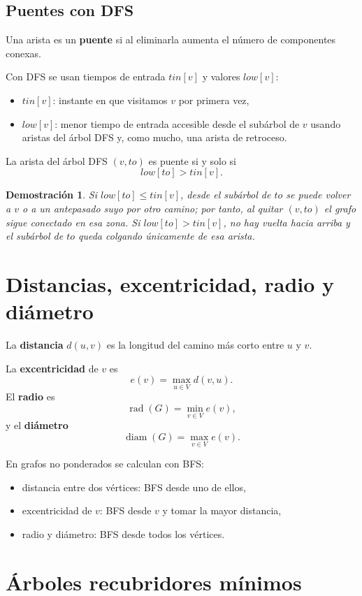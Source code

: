 \documentclass[11pt,a4paper]{article}
\newtheorem*{dem}{Demostración}
\begin{document}
\subsection{Puentes con DFS}
Una arista es un \textbf{puente} si al eliminarla aumenta el número de componentes conexas.

Con DFS se usan tiempos de entrada $tin[v]$ y valores $low[v]$:
\begin{itemize}
    \item $tin[v]$: instante en que visitamos $v$ por primera vez,
    \item $low[v]$: menor tiempo de entrada accesible desde el subárbol de $v$ usando aristas del árbol DFS y, como mucho, una arista de retroceso.
\end{itemize}

La arista del árbol DFS $(v,to)$ es puente si y solo si
\[
low[to]>tin[v].
\]

\begin{dem}
Si $low[to]\le tin[v]$, desde el subárbol de $to$ se puede volver a $v$ o a un antepasado suyo por otro camino; por tanto, al quitar $(v,to)$ el grafo sigue conectado en esa zona. Si $low[to]>tin[v]$, no hay vuelta hacia arriba y el subárbol de $to$ queda colgando únicamente de esa arista.
\end{dem}

\section{Distancias, excentricidad, radio y diámetro}

La \textbf{distancia} $d(u,v)$ es la longitud del camino más corto entre $u$ y $v$.

La \textbf{excentricidad} de $v$ es
\[
e(v)=\max_{u\in V} d(v,u).
\]
El \textbf{radio} es
\[
\operatorname{rad}(G)=\min_{v\in V} e(v),
\]
y el \textbf{diámetro}
\[
\operatorname{diam}(G)=\max_{v\in V} e(v).
\]

En grafos no ponderados se calculan con BFS:
\begin{itemize}
    \item distancia entre dos vértices: BFS desde uno de ellos,
    \item excentricidad de $v$: BFS desde $v$ y tomar la mayor distancia,
    \item radio y diámetro: BFS desde todos los vértices.
\end{itemize}

\section{Árboles recubridores mínimos}
\end{document}
